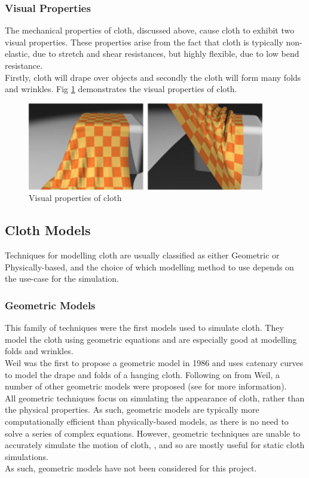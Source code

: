 \subsubsection{Visual Properties}
\label{sec:visual properties}
The mechanical properties of cloth, discussed above, cause cloth to exhibit two visual properties. These properties arise from the fact that cloth is typically non-elastic, due to stretch and shear resistances, but highly flexible, due to low bend resistance.
\\Firstly, cloth will drape over objects and secondly the cloth will form many folds and wrinkles. Fig \ref{fig:visual properties} demonstrates the visual properties of cloth.
\begin{figure}[tp]
   \begin{center}
     \includegraphics{Figures/visual_properties}
   \end{center}
   \caption[Visual Properties of cloth]{Visual properties of cloth \parencite[1]{Yalcn}}
   \label{fig:visual properties}
\end{figure}

\subsection{Cloth Models}
Techniques for modelling cloth are usually classified as either Geometric or Physically-based, and the choice of which modelling method to use depends on the use-case for the simulation.

\subsubsection{Geometric Models}
This family of techniques were the first models used to simulate cloth. They model the cloth using geometric equations and are especially good at modelling folds and wrinkles.
\\Weil was the first to propose a geometric model in 1986 and uses catenary curves to model the drape and folds of a hanging cloth. Following on from Weil, a number of other geometric models were proposed (see \textcite{Ng1996} for more information).
\\All geometric techniques focus on simulating the appearance of cloth, rather than the physical properties. As such, geometric models are typically more computationally efficient than physically-based models, as there is no need to solve a series of complex equations. However, geometric techniques are unable to accurately simulate the motion of cloth, \parencites[1]{Mongus2012}[2]{Zhang2001}[1-2]{Xinrong2009}, and so are mostly useful for static cloth simulations.
\\As such, geometric models have not been considered for this project.

